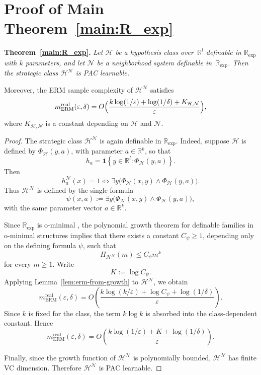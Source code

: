 \documentclass[11pt]{article}
\theoremstyle{plain}
\theoremstyle{definition}
\theoremstyle{remark}
\newenvironment{restatedtheorem}[1]
  {\par\noindent\textbf{Theorem~\ref{#1}.}\itshape}
  {\par}
\newcommand{\R}{\mathbb{R}}
\begin{document}
\section{Proof of Main Theorem~\ref{main:R_exp}}
\label{app:sec:proof-Rexp-without-bounds}

\begin{restatedtheorem}{main:R_exp}
Let $\mathcal H$ be a hypothesis class over~$\mathbb R^l$ definable in $\mathbb{R}_{\exp}$ with $k$ parameters, and let $\mathcal N$ be a neighborhood system definable in~$\mathbb{R}_{\exp}$. Then the strategic class $\mathcal H^\mathcal N$ is PAC learnable.

Moreover, the ERM sample complexity of $\mathcal H^\mathcal N$ satisfies
\[
m_{\mathrm{ERM}}^{\mathrm{real}}(\varepsilon,\delta)
=
O\Bigl(
\frac{k\log(1/\varepsilon) + \log(1/\delta) + K_{\mathcal{H},\mathcal{N}}}
{\varepsilon}
\Bigr),
\]
where $K_{\mathcal H,\mathcal N}$ is a constant depending on $\mathcal H$ and $\mathcal N$.
\end{restatedtheorem}

\begin{proof}
The strategic class \(\mathcal H^\mathcal N\) is again definable in
\(\mathbb R_{\exp}\). Indeed, suppose \(\mathcal H\) is defined by
\(\Phi_{\mathcal H}(y,a)\), with parameter \(a\in\mathbb R^k\), so that
\[
h_a
=
\mathbf 1{\!\left\{y\in\R^l:\Phi_{\mathcal H}(y,a)\right\}}.
\]
Then
\[
h_a^{\mathcal N}(x)=1
\iff
\exists y\bigl(\Phi_{\mathcal N}(x,y)\wedge \Phi_{\mathcal H}(y,a)\bigr).
\]
Thus \(\mathcal H^\mathcal N\) is defined by the single formula
\[
\psi(x,a)
:=
\exists y\bigl(\Phi_{\mathcal N}(x,y)\wedge \Phi_{\mathcal H}(y,a)\bigr),
\]
with the same parameter vector \(a\in\mathbb R^k\).

Since \(\mathbb R_{\exp}\) is o-minimal \cite{Wilkie1996modelcompleteness}, the polynomial growth theorem for definable families in o-minimal structures \cite[Corollary 4.6]{LaskowskiCompression} implies that there exists a constant \(C_\psi\ge 1\), depending only on the defining formula \(\psi\), such that
\[
\Pi_{\mathcal H^\mathcal N}(m)\le C_\psi m^k
\]
for every \(m\ge 1\). Write
\[
K:=\log C_\psi .
\]
Applying Lemma~\ref{lem:erm-from-growth} to \(\mathcal H^\mathcal N\),
we obtain
\[
m_{\mathrm{ERM}}^{\mathrm{real}}(\varepsilon,\delta)
=
O\left(
\frac{
k\log(k/\varepsilon)+\log C_\psi+\log(1/\delta)
}{\varepsilon}
\right).
\]
Since \(k\) is fixed for the class, the term \(k\log k\) is absorbed into
the class-dependent constant. Hence
\[
m_{\mathrm{ERM}}^{\mathrm{real}}(\varepsilon,\delta)
=
O\left(
\frac{
k\log(1/\varepsilon)+K+\log(1/\delta)
}{\varepsilon}
\right).
\]

Finally, since the growth function of \(\mathcal H^\mathcal N\) is polynomially
bounded, \(\mathcal H^\mathcal N\) has finite VC dimension. Therefore
\(\mathcal H^\mathcal N\) is PAC learnable.
\end{proof}
\end{document}
